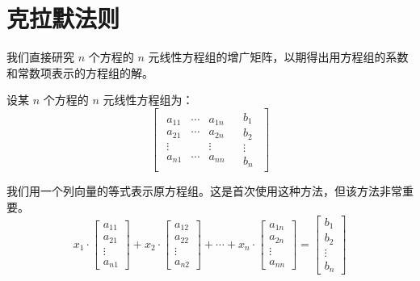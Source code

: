 
\section{克拉默法则}

我们直接研究 $n$ 个方程的 $n$ 元线性方程组的增广矩阵，以期得出用方程组的系数和常数项表示的方程组的解。

设某 $n$ 个方程的 $n$ 元线性方程组为：
$$
\left[\begin{array}{c|c}
	\begin{matrix}
		a_{11} & \cdots & a_{1n}
		\\
		a_{21} & \cdots & a_{2n}
		\\
		\vdots & & \vdots
		\\
		a_{n1} & \cdots & a_{nn}
	\end{matrix}
	&
	\begin{matrix}
		b_1 \\ b_2 \\ \vdots \\ b_n
	\end{matrix}
\end{array}\right]
$$

我们用一个列向量的等式表示原方程组。这是首次使用这种方法，但该方法非常重要。
$$
x_1 \cdot \begin{bmatrix} a_{11} \\ a_{21} \\ \vdots \\ a_{n1} \end{bmatrix} +
x_2 \cdot \begin{bmatrix} a_{12} \\ a_{22} \\ \vdots \\ a_{n2} \end{bmatrix} +
\cdots +
x_n \cdot \begin{bmatrix} a_{1n} \\ a_{2n} \\ \vdots \\ a_{nn} \end{bmatrix} =
\begin{bmatrix} b_1 \\ b_2 \\ \vdots \\ b_n \end{bmatrix}
$$

